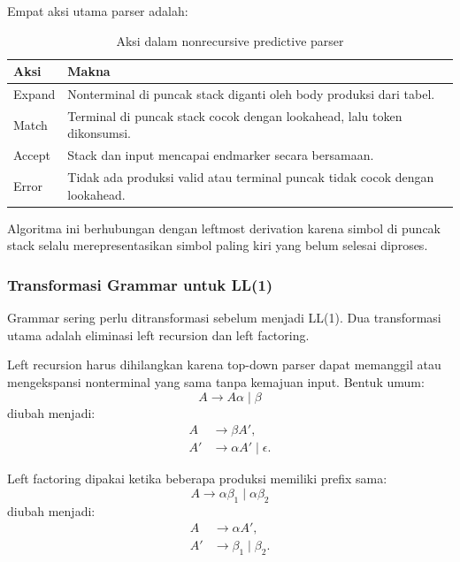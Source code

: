 Empat aksi utama parser adalah:

\begin{table}[H]
\centering
\begin{tabularx}{\textwidth}{|L{0.20\textwidth}|X|}
\hline
\textbf{Aksi} & \textbf{Makna} \\
\hline
Expand & Nonterminal di puncak stack diganti oleh body produksi dari tabel. \\
\hline
Match & Terminal di puncak stack cocok dengan lookahead, lalu token dikonsumsi. \\
\hline
Accept & Stack dan input mencapai endmarker secara bersamaan. \\
\hline
Error & Tidak ada produksi valid atau terminal puncak tidak cocok dengan lookahead. \\
\hline
\end{tabularx}
\caption{Aksi dalam nonrecursive predictive parser}
\label{tab:aksi-ll1}
\end{table}

Algoritma ini berhubungan dengan leftmost derivation karena simbol di puncak stack selalu merepresentasikan simbol paling kiri yang belum selesai diproses.

\subsubsection{Transformasi Grammar untuk LL(1)}

\begin{jawab}
Grammar sering perlu ditransformasi sebelum menjadi LL(1). Dua transformasi utama adalah eliminasi left recursion dan left factoring.
\end{jawab}

Left recursion harus dihilangkan karena top-down parser dapat memanggil atau mengekspansi nonterminal yang sama tanpa kemajuan input. Bentuk umum:
\[
    A\rightarrow A\alpha\mid\beta
\]
diubah menjadi:
\[
\begin{aligned}
    A &\rightarrow \beta A',\\
    A' &\rightarrow \alpha A'\mid\epsilon.
\end{aligned}
\]

Left factoring dipakai ketika beberapa produksi memiliki prefix sama:
\[
    A\rightarrow \alpha\beta_1\mid\alpha\beta_2
\]
diubah menjadi:
\[
\begin{aligned}
    A &\rightarrow \alpha A',\\
    A' &\rightarrow \beta_1\mid\beta_2.
\end{aligned}
\]

